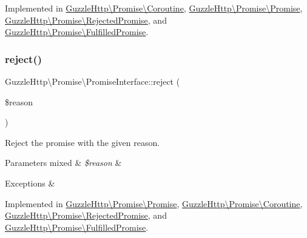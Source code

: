 Implemented in \hyperlink{classGuzzleHttp_1_1Promise_1_1Coroutine_adc412e8e82fa6fdee4649b8554452319}{Guzzle\+Http\textbackslash{}\+Promise\textbackslash{}\+Coroutine}, \hyperlink{classGuzzleHttp_1_1Promise_1_1Promise_a16b5c01afbddded8703161ec2f6694ad}{Guzzle\+Http\textbackslash{}\+Promise\textbackslash{}\+Promise}, \hyperlink{classGuzzleHttp_1_1Promise_1_1RejectedPromise_a83b4819e3244c3f0ee82c636b54bb99c}{Guzzle\+Http\textbackslash{}\+Promise\textbackslash{}\+Rejected\+Promise}, and \hyperlink{classGuzzleHttp_1_1Promise_1_1FulfilledPromise_a15a81208044c38ea1d3128094431cf7f}{Guzzle\+Http\textbackslash{}\+Promise\textbackslash{}\+Fulfilled\+Promise}.

\mbox{\label{interfaceGuzzleHttp_1_1Promise_1_1PromiseInterface_a6c34789baeca75bd8c4fb4acf4999f78}} 
\subsubsection{\texorpdfstring{reject()}{reject()}}
{\footnotesize\ttfamily Guzzle\+Http\textbackslash{}\+Promise\textbackslash{}\+Promise\+Interface\+::reject (\begin{DoxyParamCaption}\item[{}]{\$reason }\end{DoxyParamCaption})}

Reject the promise with the given reason.


\begin{DoxyParams}[1]{Parameters}
mixed & {\em \$reason} & \\
\hline
\end{DoxyParams}

\begin{DoxyExceptions}{Exceptions}
{\em } & \\
\hline
\end{DoxyExceptions}


Implemented in \hyperlink{classGuzzleHttp_1_1Promise_1_1Promise_af081d064b1d12bd61025907c94e7b4dd}{Guzzle\+Http\textbackslash{}\+Promise\textbackslash{}\+Promise}, \hyperlink{classGuzzleHttp_1_1Promise_1_1Coroutine_ad4894b8de07e0e279a475a309ca698e3}{Guzzle\+Http\textbackslash{}\+Promise\textbackslash{}\+Coroutine}, \hyperlink{classGuzzleHttp_1_1Promise_1_1RejectedPromise_a6890810c39d795507fef5d8be1a4d60d}{Guzzle\+Http\textbackslash{}\+Promise\textbackslash{}\+Rejected\+Promise}, and \hyperlink{classGuzzleHttp_1_1Promise_1_1FulfilledPromise_ade4ba1e0f6c27517479dc427372c2290}{Guzzle\+Http\textbackslash{}\+Promise\textbackslash{}\+Fulfilled\+Promise}.


